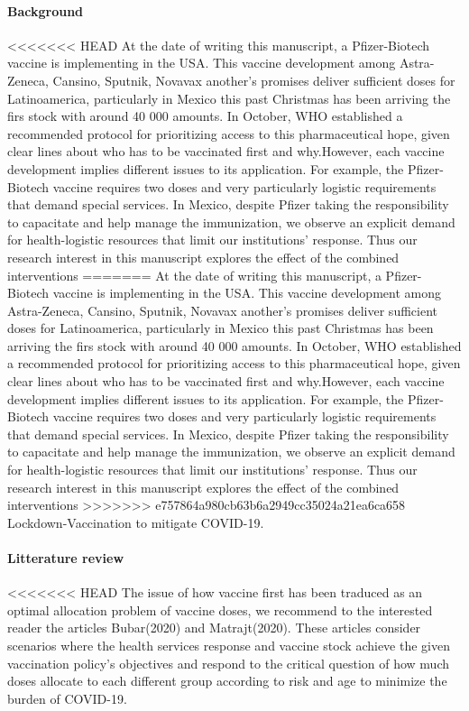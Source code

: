\paragraph{Background}
<<<<<<< HEAD
         At the date of writing this manuscript, a Pfizer-Biotech vaccine is
    implementing in the USA. This vaccine development among Astra-Zeneca,
    Cansino, Sputnik, Novavax another's promises deliver sufficient doses
    for Latinoamerica, particularly in Mexico this past Christmas has been
    arriving the firs stock with around 40 000 amounts. In October, WHO
    established a recommended protocol for prioritizing access to this
    pharmaceutical hope, given clear lines about who has to be vaccinated first
    and why.However, each vaccine development implies different issues to its
    application. For example, the Pfizer-Biotech vaccine requires two doses and
    very particularly logistic requirements that demand special services. In
    Mexico, despite Pfizer taking the responsibility to capacitate and help
    manage the immunization, we observe an explicit demand for health-logistic
    resources that limit our institutions' response. Thus our research interest
    in this manuscript explores the effect of the combined interventions
=======
         At the date of writing this manuscript, a Pfizer-Biotech vaccine is 
    implementing in the USA. This vaccine development among Astra-Zeneca, 
    Cansino, Sputnik, Novavax another's promises deliver sufficient doses 
    for Latinoamerica, particularly in Mexico this past Christmas has been 
    arriving the firs stock with around 40 000 amounts. In October, WHO 
    established a recommended protocol for prioritizing access to this 
    pharmaceutical hope, given clear lines about who has to be vaccinated first 
    and why.However, each vaccine development implies different issues to its 
    application. For example, the Pfizer-Biotech vaccine requires two doses and 
    very particularly logistic requirements that demand special services. In 
    Mexico, despite Pfizer taking the responsibility to capacitate and help 
    manage the immunization, we observe an explicit demand for health-logistic 
    resources that limit our institutions' response. Thus our research interest 
    in this manuscript explores the effect of the combined interventions 
>>>>>>> e757864a980cb63b6a2949cc35024a21ea6ca658
    Lockdown-Vaccination to mitigate COVID-19.


\paragraph{Litterature review}
<<<<<<< HEAD
        The issue of how vaccine first has been traduced as an optimal
    allocation problem of vaccine doses, we recommend to the interested reader
    the articles Bubar(2020) and  Matrajt(2020).  These articles consider
    scenarios where the health services response and vaccine stock achieve the
    given vaccination policy's objectives and respond to the critical question
    of how much doses allocate to each different group according to risk and
    age to minimize the burden of COVID-19.

